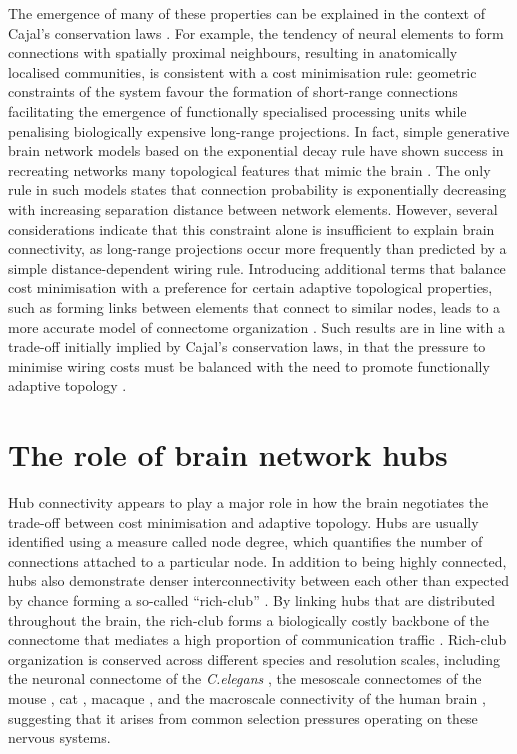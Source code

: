 The emergence of many of these properties can be explained in the context of Cajal's conservation laws \citep{RamonyCajal1995}. For example, the tendency of neural elements to form connections with spatially proximal neighbours, resulting in anatomically localised communities, is consistent with a cost minimisation rule: geometric constraints of the system favour the formation of short-range connections facilitating the emergence of functionally specialised processing units while penalising biologically expensive long-range projections. In fact, simple generative brain network models based on the exponential decay rule have shown success in recreating networks many topological features that mimic the brain \citep{Ercsey-Ravasz2013,Henderson2014}. The only rule in such models states that connection probability is exponentially decreasing with increasing separation distance between network elements. However, several considerations indicate that this constraint alone is insufficient to explain brain connectivity, as long-range projections occur more frequently than predicted by a simple distance-dependent wiring rule. Introducing additional terms that balance cost minimisation with a preference for certain adaptive topological properties, such as forming links between elements that connect to similar nodes, leads to a more accurate model of connectome organization \citep{Betzel2016,Vertes2012}. Such results are in line with a trade-off initially implied by Cajal's conservation laws, in that the pressure to minimise wiring costs must be balanced with the need to promote functionally adaptive topology \mbox{\citep{Bullmore2012}}.

\section{The role of brain network hubs}

Hub connectivity appears to play a major role in how the brain negotiates the trade-off between cost minimisation and adaptive topology. Hubs are usually identified using a measure called node degree, which quantifies the number of connections attached to a particular node. In addition to being highly connected, hubs also demonstrate denser interconnectivity between each other than expected by chance forming a so-called ``rich-club'' \citep{Fulcher2016,Harriger2012,Towlson2013,VandenHeuvel2011,Zamora-Lopez2010}. By linking hubs that are distributed throughout the brain, the rich-club forms a biologically costly backbone of the connectome that mediates a high proportion of communication traffic \citep{VandenHeuvel2012,Misic2014}. Rich-club organization is conserved across different species and resolution scales, including the neuronal connectome of the \textit{C.elegans} \citep{Towlson2013}, the mesoscale connectomes of the mouse \citep{Oh2014,Fulcher2016}, cat \citep{DeReus2013b}, macaque \citep{Harriger2012}, and the macroscale connectivity of the human brain \citep{VandenHeuvel2011}, suggesting that it arises from common selection pressures operating on these nervous systems.

